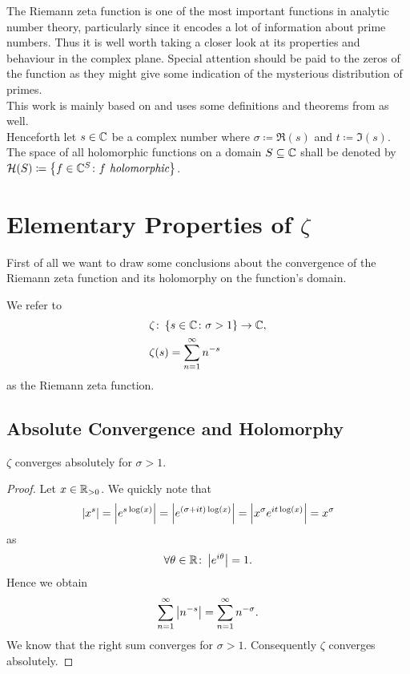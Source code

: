 The Riemann zeta function is one of the most important functions in analytic number theory, particularly since it encodes a lot of information about prime numbers. Thus it is well worth taking a closer look at its properties and behaviour in the complex plane. Special attention should be paid to the zeros of the function as they might give some indication of the mysterious distribution of primes. \\
This work is mainly based on \cite{Apostol1976} and uses some definitions and theorems from \cite{Ahlfors1966} as well. \\
Henceforth let $s \in \mathbb{C}$ be a complex number where $\sigma \coloneqq \Re(s)$ and $t \coloneqq \Im(s)$. The space of all holomorphic functions on a domain $S \subseteq \mathbb{C}$ shall be denoted by $\mathcal{H}(S) \coloneqq \left\{f \in \mathbb{C} ^S \colon f \textit{ holomorphic}\right\}$.


\section{Elementary Properties of $\zeta$}
First of all we want to draw some conclusions about the convergence of the Riemann zeta function and its holomorphy on the function's domain.


\begin{definition}
	We refer to
\begin{equation*}
\begin{aligned}	
	&\zeta \colon \left\{s \in \mathbb{C} \colon \sigma > 1\right\} \to \mathbb{C}, \\
	&\zeta(s) = \sum_{n = 1}^{\infty} n^{-s}
\end{aligned}
\end{equation*}
	as the Riemann zeta function.
\end{definition}


\subsection{Absolute Convergence and Holomorphy}


\begin{theorem}
	$\zeta$ converges absolutely for $\sigma > 1$.
\end{theorem}
\begin{proof}
	Let $x \in \mathbb{R}_{>0}$. We quickly note that
\begin{equation*}
	\left|x^s\right|
	= \left|e^{s \log(x)}\right|
	= \left|e^{(\sigma + i t) \log(x)}\right|
	= \left|x^{\sigma} e^{i t \log(x)}\right|
	= x^{\sigma}
\end{equation*}
	as
\begin{equation*}
	\forall \theta \in \mathbb{R} \colon \left|e^{i \theta}\right| = 1.
\end{equation*}
	Hence we obtain
\begin{equation*}
	\sum_{n = 1}^{\infty} \left|n^{-s}\right| = \sum_{n = 1}^{\infty} n^{-\sigma}.
\end{equation*}
	We know that the right sum converges for $\sigma > 1$. Consequently $\zeta$ converges absolutely.
\end{proof}


